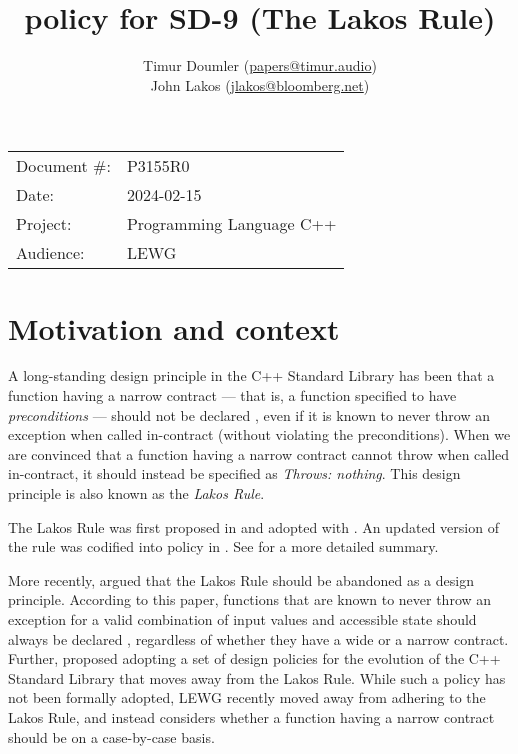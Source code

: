

 \usepackage[bottom]{footmisc} 
 
 \setcounter{section}{-1}


\title{ policy for SD-9 (The Lakos Rule)}
\author{ Timur Doumler \small(\href{mailto:papers@timur.audio}{papers@timur.audio})  \\
John Lakos \small(\href{mailto:jlakos@bloomberg.net}{jlakos@bloomberg.net})
}
\date{}
\maketitle

\begin{tabular}{ll}
Document \#: & P3155R0 \\
Date: &2024-02-15 \\
Project: & Programming Language C++ \\
Audience: & LEWG
\end{tabular}



\section{Motivation and context}
\label{sec:intro}


A long-standing design principle in the C++ Standard Library has been that a function having a narrow contract --- that is, a function specified to have \emph{preconditions} --- should not be declared , even if it is known to never throw an exception when called in-contract (without violating the preconditions). When we are convinced that a function having a narrow contract cannot throw when called in-contract, it should instead be specified as \emph{Throws: nothing}. This design principle is also known as the \emph{Lakos Rule}.

The Lakos Rule was first proposed in \cite{N3248} and adopted with \cite{N3279}. An updated version of the rule was codified into policy in \cite{P0884R0}. See \cite{O'Dwyer2018} for a more detailed summary.

More recently, \cite{P1656R2} argued that the Lakos Rule should be abandoned as a design principle. According to this paper, functions that are known to never throw an exception for a valid combination of input values and accessible state should always be declared , regardless of whether they have a wide or a narrow contract. Further, \cite{P2148R0} proposed adopting a set of design policies for the evolution of the C++ Standard Library that moves away from the Lakos Rule. While such a policy has not been formally adopted, LEWG recently moved away from adhering to the Lakos Rule, and instead considers whether a function having a narrow contract should be  on a case-by-case basis.

